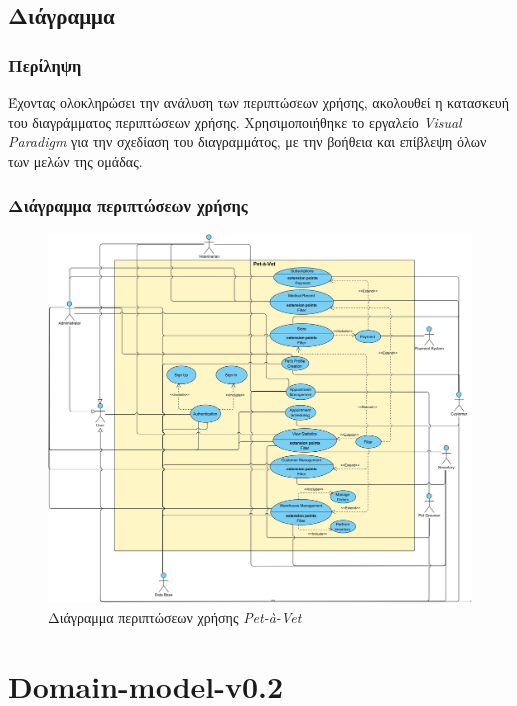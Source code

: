 \documentclass[12pt,a4paper,twoside]{book}
\begin{document}
\section{Διάγραμμα} %

\subsection{Περίληψη}

Έχοντας ολοκληρώσει την ανάλυση των περιπτώσεων χρήσης, ακολουθεί η κατασκευή του διαγράμματος περιπτώσεων χρήσης. Χρησιμοποιήθηκε το εργαλείο \textit{Visual Paradigm} για την σχεδίαση του διαγραμμάτος, με την βοήθεια και επίβλεψη όλων των μελών της ομάδας. %

\subsection{Διάγραμμα περιπτώσεων χρήσης}

\begin{figure}[H]
  \centering
  \includegraphics[width=1\textwidth]{Resources/Use-casel-v0.2.png}
  \caption{Διάγραμμα περιπτώσεων χρήσης \textit{Pet-à-Vet}}\label{fig:use-case-diagram}
\end{figure}

\chapter{Domain-model-v0.2}
\end{document}
